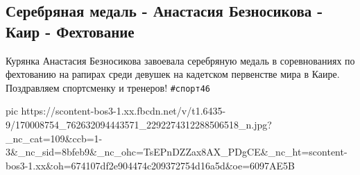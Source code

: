  
 
 
 
 

\subsection{Серебряная медаль - Анастасия Безносикова - Каир - Фехтование}

Курянка Анастасия Безносикова завоевала серебряную медаль в соревнованиях по
фехтованию на рапирах среди девушек на кадетском первенстве мира в Каире.
Поздравляем спортсменку и тренеров! \verb|#спорт46|

\ifcmt
  pic https://scontent-bos3-1.xx.fbcdn.net/v/t1.6435-9/170008754_762632094443571_2292274312288506518_n.jpg?_nc_cat=109&ccb=1-3&_nc_sid=8bfeb9&_nc_ohc=TsEPnDZZax8AX_PDgCE&_nc_ht=scontent-bos3-1.xx&oh=674107df2e904474c209372754d16a5d&oe=6097AE5B
\fi

